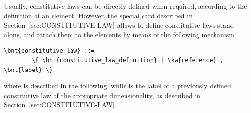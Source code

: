 Usually, constitutive laws can be directly defined when required,
according to the definition of an element.
However, the special card described in Section~\ref{sec:CONSTITUTIVE-LAW}
allows to define constitutive laws stand-alone, and attach them
to the elements by means of the following mechanism:
\begin{Verbatim}[commandchars=\\\{\}]
    \bnt{constitutive_law} ::=
        \{ \bnt{constitutive_law_definition} | \kw{reference} , \bnt{label} \}
\end{Verbatim}
where  is described in the following,
while  is the label of a previously defined constitutive law
of the appropriate dimensionality, as described
in Section~\ref{sec:CONSTITUTIVE-LAW}.



